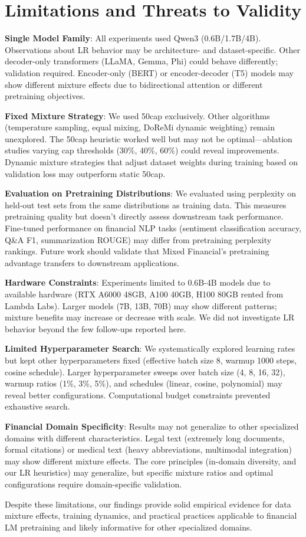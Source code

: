 \section{Limitations and Threats to Validity}

\textbf{Single Model Family}: All experiments used Qwen3 (0.6B/1.7B/4B). Observations about LR behavior may be architecture- and dataset-specific. Other decoder-only transformers (LLaMA, Gemma, Phi) could behave differently; validation required. Encoder-only (BERT) or encoder-decoder (T5) models may show different mixture effects due to bidirectional attention or different pretraining objectives.

\textbf{Fixed Mixture Strategy}: We used 50cap exclusively. Other algorithms (temperature sampling, equal mixing, DoReMi dynamic weighting) remain unexplored. The 50cap heuristic worked well but may not be optimal—ablation studies varying cap thresholds (30\%, 40\%, 60\%) could reveal improvements. Dynamic mixture strategies that adjust dataset weights during training based on validation loss may outperform static 50cap.

\textbf{Evaluation on Pretraining Distributions}: We evaluated using perplexity on held-out test sets from the same distributions as training data. This measures pretraining quality but doesn't directly assess downstream task performance. Fine-tuned performance on financial NLP tasks (sentiment classification accuracy, Q\&A F1, summarization ROUGE) may differ from pretraining perplexity rankings. Future work should validate that Mixed Financial's pretraining advantage transfers to downstream applications.

\textbf{Hardware Constraints}: Experiments limited to 0.6B-4B models due to available hardware (RTX A6000 48GB, A100 40GB, H100 80GB rented from Lambda Labs). Larger models (7B, 13B, 70B) may show different patterns; mixture benefits may increase or decrease with scale. We did not investigate LR behavior beyond the few follow-ups reported here.

\textbf{Limited Hyperparameter Search}: We systematically explored learning rates but kept other hyperparameters fixed (effective batch size 8, warmup 1000 steps, cosine schedule). Larger hyperparameter sweeps over batch size (4, 8, 16, 32), warmup ratios (1\%, 3\%, 5\%), and schedules (linear, cosine, polynomial) may reveal better configurations. Computational budget constraints prevented exhaustive search.

\textbf{Financial Domain Specificity}: Results may not generalize to other specialized domains with different characteristics. Legal text (extremely long documents, formal citations) or medical text (heavy abbreviations, multimodal integration) may show different mixture effects. The core principles (in-domain diversity, and our LR heuristics) may generalize, but specific mixture ratios and optimal configurations require domain-specific validation.

Despite these limitations, our findings provide solid empirical evidence for data mixture effects, training dynamics, and practical practices applicable to financial LM pretraining and likely informative for other specialized domains.

